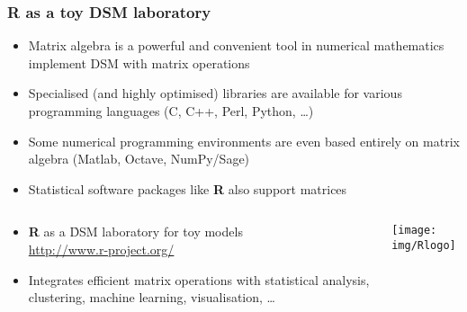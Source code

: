 \begin{frame}
  \frametitle{R as a toy DSM laboratory}

  \begin{itemize}
  \item Matrix algebra is a powerful and convenient tool in numerical
    mathematics \so implement DSM with matrix operations
  \item Specialised (and highly optimised) libraries are available for various
    programming languages (C, C++, Perl, Python, \ldots)
  \item Some numerical programming environments are even based entirely on
    matrix algebra (Matlab, Octave, NumPy/Sage)
  \item Statistical software packages like \textbf{R} also support matrices
  \end{itemize}
  \pause
  \begin{columns}[c]
    \begin{column}{75mm}
      \begin{itemize}
      \item \textbf{R} as a \h{DSM laboratory} for toy models\\
        \url{http://www.r-project.org/}
      \item Integrates efficient matrix operations with statistical analysis,
        clustering, machine learning, visualisation, \ldots
      \end{itemize}
    \end{column}
    \begin{column}{20mm}
      \texttt{[image: img/Rlogo]}
    \end{column}
  \end{columns}
\end{frame}

